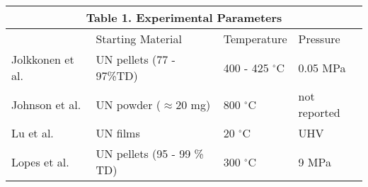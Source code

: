 \documentclass[3p,review,11pt]{elsarticle}
\begin{document}
\par 



\begin{tabular}{ |p{3cm}|p{3cm}|p{3cm}|p{3cm}|  }
	\hline
	\multicolumn{4}{|c|}{\textbf{Table 1.} Experimental Parameters} \\
	\hline
	 & Starting Material &Temperature & Pressure\\
	\hline
	Jolkkonen et al. \cite{Jolkkonen2017}   &  UN pellets (77 - 97\%TD) &400 - 425 $^{\circ}$C&  0.05 MPa \\
	Johnson et al. \cite{Johnson2016}   & UN powder ($\approx$20 mg)     &800 $^{\circ}$C&  not reported \\
	Lu et al. \cite{Lu2016}  & UN films    &20 $^{\circ}$C&   UHV \\
	Lopes et al. \cite{Lopes2017}   & UN pellets (95 - 99 \% TD)    & 300 $^{\circ}$C&   9 MPa \\
	\hline
\end{tabular}
\end{document}
